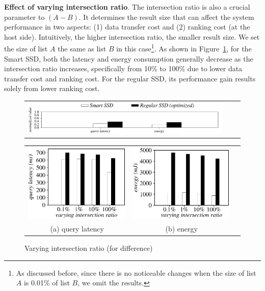 \textbf{Effect of varying intersection ratio}.
The intersection ratio is also a crucial parameter to $(A-B)$. It determines the result size that can affect the system performance in two aspects: (1) data transfer cost and (2) ranking cost (at the host side). Intuitively, the higher intersection ratio, the smaller result size. We set the size of list $A$ the same as list $B$ in this case\footnote{\small As discussed before, since there is no noticeable changes when the size of list $A$ is 0.01\% of list $B$, we omit the results.}. As shown in Figure~\ref{fig:varyInterRatioDifference}, for the Smart SSD, both the latency and energy consumption generally decrease as the intersection ratio increases, specifically from 10\% to 100\% due to lower data transfer cost and ranking cost. For the regular SSD, its performance gain results solely from lower ranking cost.

\begin{figure}[htbp]
\centering
\begin{tabular}{ccc}
\includegraphics[width=0.52\columnwidth]{figures/banner2.pdf}
\end{tabular}
\vspace{-0.1cm}
\renewcommand{\tabcolsep}{0.1mm}
\begin{tabular}{ccc}
\includegraphics[width=0.5\columnwidth]{figures/Difference-time-VaryInterRatio-equal.eps}&
\includegraphics[width=0.5\columnwidth]{figures/Difference-energy-VaryInterRatio-equal.eps}\\
(a) query latency & (b) energy
\end{tabular}
\caption{Varying intersection ratio (for difference)}
\label{fig:varyInterRatioDifference}
\end{figure}


